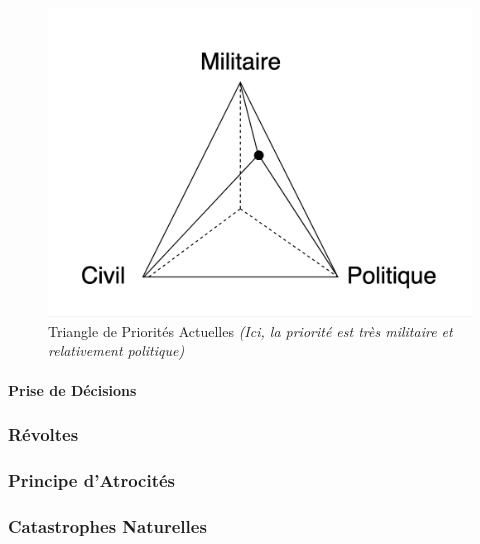 \documentclass{article}
\begin{document}
                    \begin{figure}[h]
                        \centering
                            \includegraphics[scale=0.2]{schema_triangle_priorite.png}
                            \caption{Triangle de Priorités Actuelles \textit{(Ici, la priorité est très militaire et relativement politique)}}
                            \label{fig:x photosysteme}
                    \end{figure}

                \paragraph{Prise de Décisions}

        \subsubsection{Révoltes}

        \subsubsection{Principe d'Atrocités}

        \subsubsection{Catastrophes Naturelles}
        
\end{document}
